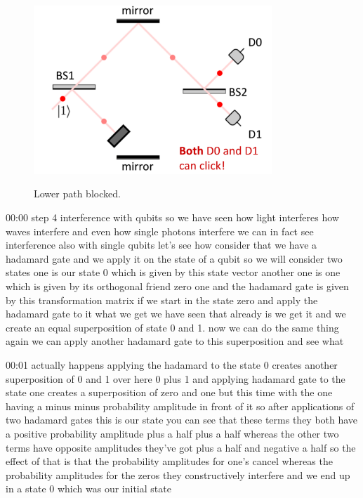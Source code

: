 \begin{figure}[H]
   \centering
    \includegraphics[width=0.8\textwidth]{lesson6/bottom_blocked.pdf}
    \label{fig: 1}
    
        \caption{Lower path blocked.}
    
\end{figure}


00:00
step 4 interference with qubits so we have seen how light interferes how
waves interfere and even how single photons interfere we can in fact see
interference also with single qubits let's see how
consider that we have a hadamard gate and we apply it on the state of a qubit
so we will consider two states one is our state 0 which is given by this state
vector another one is one which is given by its orthogonal
friend zero one and the hadamard gate is given by this transformation matrix
if we start in the state zero and apply the hadamard gate to it
what we get we have seen that already is we get it and we create an equal
superposition of state 0 and 1. now we can do the same thing again we
can apply another hadamard gate to this superposition and see what

00:01
actually happens applying the hadamard to the state 0
creates another superposition of 0 and 1
over here 0 plus 1 and applying hadamard gate to the state one
creates a superposition of zero and one but this time
with the one having a minus minus probability amplitude in front of it so after
applications of two hadamard gates this is our state you can see
that these terms they both have a positive probability amplitude
plus a half plus a half whereas the other two terms have opposite
amplitudes they've got plus a half and negative a half so the effect of that
is that the probability amplitudes for one's cancel
whereas the probability amplitudes for the zeros they
constructively interfere and we end up in a state 0 which was our initial state

